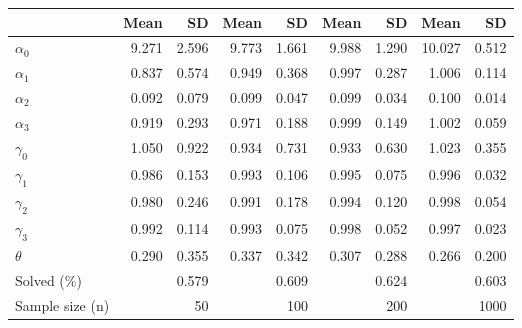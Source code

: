 
\begin{tabular}[t]{lrrrrrrrr}
\toprule
  & Mean & SD & Mean  & SD  & Mean   & SD   & Mean    & SD   \\
\midrule
$\alpha_{0}$ & 9.271 & 2.596 & 9.773 & 1.661 & 9.988 & 1.290 & 10.027 & 0.512\\
$\alpha_{1}$ & 0.837 & 0.574 & 0.949 & 0.368 & 0.997 & 0.287 & 1.006 & 0.114\\
$\alpha_{2}$ & 0.092 & 0.079 & 0.099 & 0.047 & 0.099 & 0.034 & 0.100 & 0.014\\
$\alpha_{3}$ & 0.919 & 0.293 & 0.971 & 0.188 & 0.999 & 0.149 & 1.002 & 0.059\\
$\gamma_{0}$ & 1.050 & 0.922 & 0.934 & 0.731 & 0.933 & 0.630 & 1.023 & 0.355\\
$\gamma_{1}$ & 0.986 & 0.153 & 0.993 & 0.106 & 0.995 & 0.075 & 0.996 & 0.032\\
$\gamma_{2}$ & 0.980 & 0.246 & 0.991 & 0.178 & 0.994 & 0.120 & 0.998 & 0.054\\
$\gamma_{3}$ & 0.992 & 0.114 & 0.993 & 0.075 & 0.998 & 0.052 & 0.997 & 0.023\\
$\theta$ & 0.290 & 0.355 & 0.337 & 0.342 & 0.307 & 0.288 & 0.266 & 0.200\\
Solved (\%) &  & 0.579 &  & 0.609 &  & 0.624 &  & 0.603\\
Sample size (n) &  & 50 &  & 100 &  & 200 &  & 1000\\
\bottomrule
\end{tabular}
